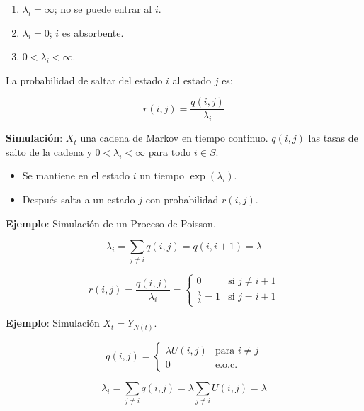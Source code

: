 \documentclass[12pt,a4paper]{article}
\begin{document}
\begin{enumerate}
    \item $\lambda_i = \infty$; no se puede entrar al $i$.
    \item $\lambda_i = 0$; $i$ es absorbente.
    \item $0 < \lambda_i < \infty$.
\end{enumerate}

La probabilidad de saltar del estado $i$ al estado $j$ es:

\begin{equation*}
r(i,j) = \frac{q(i,j)}{\lambda_i}
\end{equation*}


\textbf{Simulación}: $X_t$ una cadena de Markov en tiempo continuo. $q(i,j)$ las tasas de salto de la cadena y $0 < \lambda_i < \infty$ para todo $i \in S$.

\begin{itemize}
    \item Se mantiene en el estado $i$ un tiempo $\exp(\lambda_i)$.
    \item Después salta a un estado $j$ con probabilidad $r(i,j)$.
\end{itemize}

\textbf{Ejemplo}: Simulación de un Proceso de Poisson.

\begin{equation*}
\lambda_i = \sum_{j \neq i} q(i,j) = q(i,i+1) = \lambda
\end{equation*}

\begin{equation*}
r(i,j) = \frac{q(i,j)}{\lambda_i} = \begin{cases}
0 & \text{si } j \neq i+1 \\
\frac{\lambda}{\lambda} = 1 & \text{si } j = i+1
\end{cases}
\end{equation*}

\textbf{Ejemplo}: Simulación $X_t = Y_{N(t)}$.

\begin{equation*}
q(i,j) = \begin{cases}
\lambda U(i,j) & \text{para } i \neq j \\
0 & \text{e.o.c.}
\end{cases}
\end{equation*}

\begin{equation*}
\lambda_i = \sum_{j \neq i} q(i,j) = \lambda \sum_{j \neq i} U(i,j) = \lambda
\end{equation*}
\end{document}
